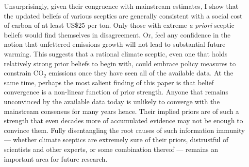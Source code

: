 \documentclass[smallextended]{svjour3}       %
\begin{document}
Unsurprisingly, given their congruence with mainstream estimates, I show
that the updated beliefs of various sceptics are generally consistent
with a social cost of carbon of at least US\$25 per ton. Only those with
extreme \emph{a priori} sceptic beliefs would find themselves in
disagreement. Or, feel any confidence in the notion that unfettered
emissions growth will not lead to substantial future warming. This
suggests that a rational climate sceptic, even one that holds relatively
strong prior beliefs to begin with, could embrace policy measures to
constrain CO\(_2\) emissions once they have seen all of the available
data. At the same time, perhaps the most salient finding of this paper
is that belief convergence is a non-linear function of prior strength.
Anyone that remains unconvinced by the available data today is unlikely
to converge with the mainstream consensus for many years hence. Their
implied priors are of such a strength that even decades more of
accumulated evidence may not be enough to convince them. Fully
disentangling the root causes of such information immunity --- whether
climate sceptics are extremely sure of their priors, distrustful of
scientists and other experts, or some combination thereof --- remains an
important area for future research.



\end{document}
